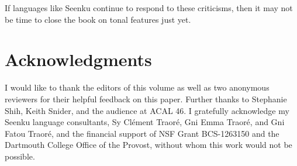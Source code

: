 \documentclass[output=paper]{langsci/langscibook}
\begin{document}
If languages like Seenku continue to respond to these criticisms, then it may not be time to close the book on tonal features just yet.

\section*{Acknowledgments}

I would like to thank the editors of this volume as well as two anonymous reviewers for their helpful feedback on this paper. Further thanks to Stephanie Shih, Keith Snider, and the audience at ACAL 46. I gratefully acknowledge my Seenku language consultants, Sy Cl\'ement Traor\'e, Gni Emma Traor\'e, and Gni Fatou Traor\'e, and the financial support of NSF Grant BCS-1263150 and the Dartmouth College Office of the Provost, without whom this work would not be possible.

{\sloppy
\printbibliography[heading=subbibliography,notkeyword=this]
}
\end{document}
